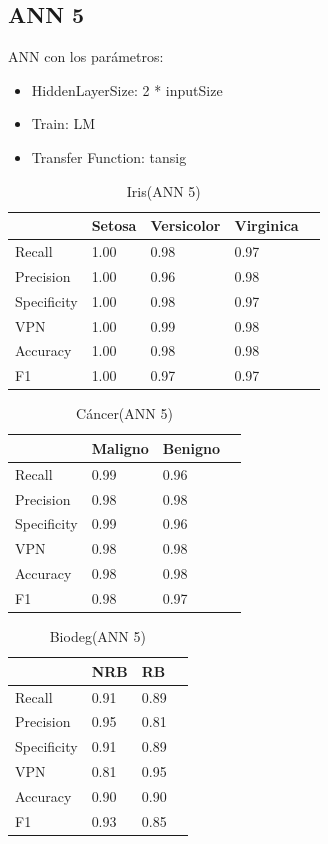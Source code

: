 \documentclass[a4paper,openwrite,12pt]{article}
\begin{document}
\subsection{ANN 5}
ANN con los parámetros:
\begin{itemize}
    \item HiddenLayerSize: 2 * inputSize
    \item Train: LM
    \item Transfer Function: tansig
\end{itemize}

\begin{table}[H]
\centering
\begin{tabular}{@{}lllll@{}}
\toprule
            & Setosa & Versicolor & Virginica &  \\ \midrule
Recall      & 1.00   & 0.98       & 0.97      &  \\
Precision   & 1.00   & 0.96       & 0.98      &  \\
Specificity & 1.00   & 0.98       & 0.97      &  \\
VPN         & 1.00   & 0.99       & 0.98      &  \\
Accuracy    & 1.00   & 0.98       & 0.98      &  \\
F1          & 1.00   & 0.97       & 0.97      &  \\ \bottomrule
\end{tabular}
\caption{Iris(ANN 5)}
\end{table}


\begin{table}[H]
\centering
\begin{tabular}{@{}llll@{}}
\toprule
            & Maligno & Benigno &  \\ \midrule
Recall      & 0.99    & 0.96    &  \\
Precision   & 0.98    & 0.98    &  \\
Specificity & 0.99    & 0.96    &  \\
VPN         & 0.98    & 0.98    &  \\
Accuracy    & 0.98    & 0.98    &  \\
F1          & 0.98    & 0.97    &  \\ \bottomrule
\end{tabular}
\caption{Cáncer(ANN 5)}
\end{table}

\begin{table}[H]
\centering
\begin{tabular}{@{}llll@{}}
\toprule
            & NRB &   RB &  \\ \midrule
Recall      & 0.91    & 0.89    &  \\
Precision   & 0.95    & 0.81    &  \\
Specificity & 0.91    & 0.89    &  \\
VPN         & 0.81    & 0.95    &  \\
Accuracy    & 0.90    & 0.90    &  \\
F1          & 0.93    & 0.85    &  \\ \bottomrule
\end{tabular}
\caption{Biodeg(ANN 5)}
\end{table}
\end{document}
